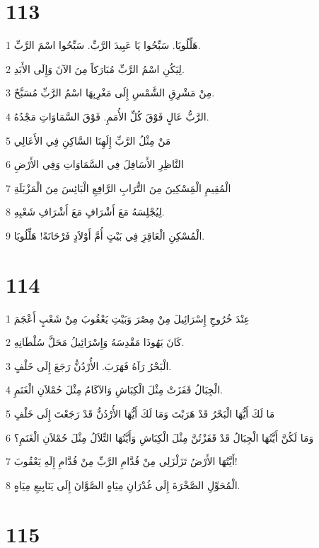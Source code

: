 \chapter{113}

\par 1 هَلِّلُويَا. سَبِّحُوا يَا عَبِيدَ الرَّبِّ. سَبِّحُوا اسْمَ الرَّبِّ.
\par 2 لِيَكُنِ اسْمُ الرَّبِّ مُبَارَكاً مِنَ الآنَ وَإِلَى الأَبَدِ.
\par 3 مِنْ مَشْرِقِ الشَّمْسِ إِلَى مَغْرِبِهَا اسْمُ الرَّبِّ مُسَبَّحٌ.
\par 4 الرَّبُّ عَالٍ فَوْقَ كُلِّ الأُمَمِ. فَوْقَ السَّمَاوَاتِ مَجْدُهُ.
\par 5 مَنْ مِثْلُ الرَّبِّ إِلَهِنَا السَّاكِنِ فِي الأَعَالِي
\par 6 النَّاظِرِ الأَسَافِلَ فِي السَّمَاوَاتِ وَفِي الأَرْضِ
\par 7 الْمُقِيمِ الْمَِسْكِينَ مِنَ التُّرَابِ الرَّافِعِ الْبَائِسَ مِنَ الْمَزْبَلَةِ
\par 8 لِيُجْلِسَهُ مَعَ أَشْرَافٍ مَعَ أَشْرَافِ شَعْبِهِ.
\par 9 الْمُسْكِنِ الْعَاقِرَِ فِي بَيْتٍ أُمَّ أَوْلاَدٍ فَرْحَانَةً! هَلِّلُويَا.

\chapter{114}

\par 1 عِنْدَ خُرُوجِ إِسْرَائِيلَ مِنْ مِصْرَ وَبَيْتِ يَعْقُوبَ مِنْ شَعْبٍ أَعْجَمَ
\par 2 كَانَ يَهُوذَا مَقْدِسَهُ وَإِسْرَائِيلُ مَحَلَّ سُلْطَانِهِ.
\par 3 الْبَحْرُ رَآهُ فَهَرَبَ. الأُرْدُنُّ رَجَعَ إِلَى خَلْفٍ.
\par 4 الْجِبَالُ قَفَزَتْ مِثْلَ الْكِبَاشِ وَالآكَامُ مِثْلَ حُمْلاَنِ الْغَنَمِ.
\par 5 مَا لَكَ أَيُّهَا الْبَحْرُ قَدْ هَرَبْتَ وَمَا لَكَ أَيُّهَا الأُرْدُنُّ قَدْ رَجَعْتَ إِلَى خَلْفٍ
\par 6 وَمَا لَكُنَّ أَيَّتُهَا الْجِبَالُ قَدْ قَفَزْتُنَّ مِثْلَ الْكِبَاشِ وَأَيَّتُهَا التِّلاَلُ مِثْلَ حُمْلاَنِ الْغَنَمِ؟
\par 7 أَيَّتُهَا الأَرْضُ تَزَلْزَلِي مِنْ قُدَّامِ الرَّبِّ مِنْ قُدَّامِ إِلَهِ يَعْقُوبَ!
\par 8 الْمُحَوِّلِ الصَّخْرَةَ إِلَى غُدْرَانِ مِيَاهٍ الصَّوَّانَ إِلَى يَنَابِيعِ مِيَاهٍ.

\chapter{115}

